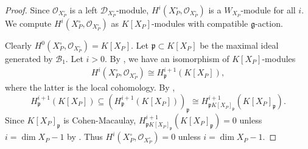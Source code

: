 \documentclass[11pt,a4paper,usenames,dvipsnames,reqno]{amsart}
\numberwithin{equation}{section}
\theoremstyle{definition}
\theoremstyle{remark}
\begin{document}
\begin{proof}
    Since $\mathcal{O}_{X_P^\circ}$ is a left $\mathcal{D}_{X_P^\circ}$-module,  $H^i(X_P^\circ,\mathcal{O}_{X_P^\circ})$ is a $W_{X_P}$-module for all $i$. We compute $H^i(X_P^\circ,\mathcal{O}_{X_P^\circ})$ as $K[X_P]$-modules with compatible $\mathfrak{g}$-action.
    
    Clearly $H^0(X_P^{\circ},\mathcal{O}_{X_P^\circ})=K[X_P]$. Let $\mathfrak{p}\subset K[X_P]$ be the maximal ideal generated by $\mathcal{B}_1.$ Let $i>0$. By \cite[4.6.2]{Weibel}, we have an isomorphism of $K[X_P]$-modules
    \begin{align*}
        H^i(X_P^\circ,\mathcal{O}_{X_P^\circ})\cong H^{i+1}_{\mathfrak{p}}(K[X_P]),
    \end{align*}
    where the latter is the local cohomology. By \cite[Proposition 2.14(1)]{Localcohomology}, 
    $$H^{i+1}_{\mathfrak{p}}(K[X_P])\subseteq (H^{i+1}_{\mathfrak{p}}(K[X_P]))_\mathfrak{p}\cong H^{i+1}_{\mathfrak{p}K[X_P]_\mathfrak{p}}(K[X_P]_\mathfrak{p}).$$
   Since $K[X_P]_\mathfrak{p}$ is Cohen-Macaulay,  $H^{i+1}_{\mathfrak{p}K[X_P]_\mathfrak{p}}(K[X_P]_\mathfrak{p})=0$ unless $i=\dim X_P-1$ by \cite[Corollary 4.6.9]{Weibel}. Thus $H^i(X_P^\circ,\mathcal{O}_{X_P^\circ})=0$ unless $i=\dim X_P-1$.


\end{proof}
\end{document}
